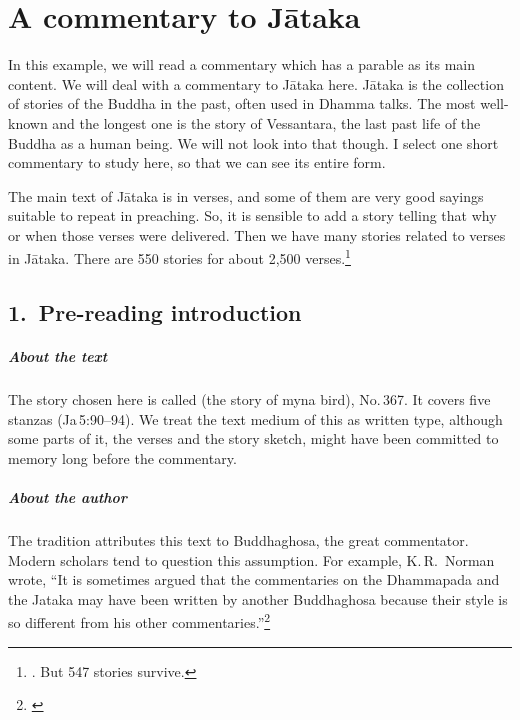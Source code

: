 \chapter{A commentary to J\=ataka}\label{chap:comja}

In this example, we will read a commentary which has a parable as its main content. We will deal with a commentary to J\=ataka here. J\=ataka is the collection of stories of the Buddha in the past, often used in Dhamma talks. The most well-known and the longest one is the story of Vessantara, the last past life of the Buddha as a human being. We will not look into that though. I select one short commentary to study here, so that we can see its entire form. 

The main text of J\=ataka is in verses, and some of them are very good sayings suitable to repeat in preaching. So, it is sensible to add a story telling that why or when those verses were delivered. Then we have many stories related to verses in J\=ataka. There are 550 stories for about 2,500 verses.\footnote{\citealp[pp.~54--5]{hinuber:literature}. But 547 stories survive.}

{}
\section*{1.\ Pre-reading introduction}

\paragraph*{About the text} The story chosen here is called  (the story of myna bird), No.\,367. It covers five stanzas (Ja\,5:90--94). We treat the text medium of this as written type, although some parts of it, the verses and the story sketch, might have been committed to memory long before the commentary.

\paragraph*{About the author} The tradition attributes this text to Buddhaghosa, the great commentator. Modern scholars tend to question this assumption. For example, K.\,R.\ Norman wrote, ``It is sometimes argued that the commentaries on the Dhammapada and the Jataka may have been written by another Buddhaghosa because their style is so different from his other commentaries.''\footnote{\citealp[p.~127]{norman:literature}}

